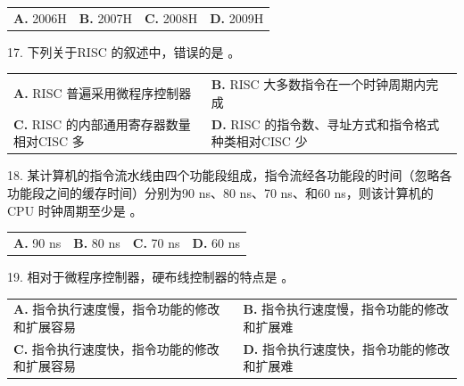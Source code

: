\documentclass[UTF8,11pt]{ctexart}
\begin{document}
\begin{center}\begin{tabular}{>{\raggedright\arraybackslash}p{\dimexpr(\linewidth-8\tabcolsep)/4\relax}>{\raggedright\arraybackslash}p{\dimexpr(\linewidth-8\tabcolsep)/4\relax}>{\raggedright\arraybackslash}p{\dimexpr(\linewidth-8\tabcolsep)/4\relax}>{\raggedright\arraybackslash}p{\dimexpr(\linewidth-8\tabcolsep)/4\relax}}
\textbf{A.} 2006H & \textbf{B.} 2007H & \textbf{C.} 2008H & \textbf{D.} 2009H\\[.35em]\end{tabular}\end{center}

17. 下列关于RISC 的叙述中，错误的是 。


\begin{center}\begin{tabular}{>{\raggedright\arraybackslash}p{\dimexpr(\linewidth-4\tabcolsep)/2\relax}>{\raggedright\arraybackslash}p{\dimexpr(\linewidth-4\tabcolsep)/2\relax}}
\textbf{A.} RISC 普遍采用微程序控制器 & \textbf{B.} RISC 大多数指令在一个时钟周期内完成\\[.35em]
\textbf{C.} RISC 的内部通用寄存器数量相对CISC 多 & \textbf{D.} RISC 的指令数、寻址方式和指令格式种类相对CISC 少\\[.35em]\end{tabular}\end{center}

18. 某计算机的指令流水线由四个功能段组成，指令流经各功能段的时间（忽略各功能段之间的缓存时间）分别为90 ns、80 ns、70 ns、和60 ns，则该计算机的CPU 时钟周期至少是 。


\begin{center}\begin{tabular}{>{\raggedright\arraybackslash}p{\dimexpr(\linewidth-8\tabcolsep)/4\relax}>{\raggedright\arraybackslash}p{\dimexpr(\linewidth-8\tabcolsep)/4\relax}>{\raggedright\arraybackslash}p{\dimexpr(\linewidth-8\tabcolsep)/4\relax}>{\raggedright\arraybackslash}p{\dimexpr(\linewidth-8\tabcolsep)/4\relax}}
\textbf{A.} 90 ns & \textbf{B.} 80 ns & \textbf{C.} 70 ns & \textbf{D.} 60 ns\\[.35em]\end{tabular}\end{center}

19. 相对于微程序控制器，硬布线控制器的特点是 。


\begin{center}\begin{tabular}{>{\raggedright\arraybackslash}p{\dimexpr(\linewidth-4\tabcolsep)/2\relax}>{\raggedright\arraybackslash}p{\dimexpr(\linewidth-4\tabcolsep)/2\relax}}
\textbf{A.} 指令执行速度慢，指令功能的修改和扩展容易 & \textbf{B.} 指令执行速度慢，指令功能的修改和扩展难\\[.35em]
\textbf{C.} 指令执行速度快，指令功能的修改和扩展容易 & \textbf{D.} 指令执行速度快，指令功能的修改和扩展难\\[.35em]\end{tabular}\end{center}
\end{document}
